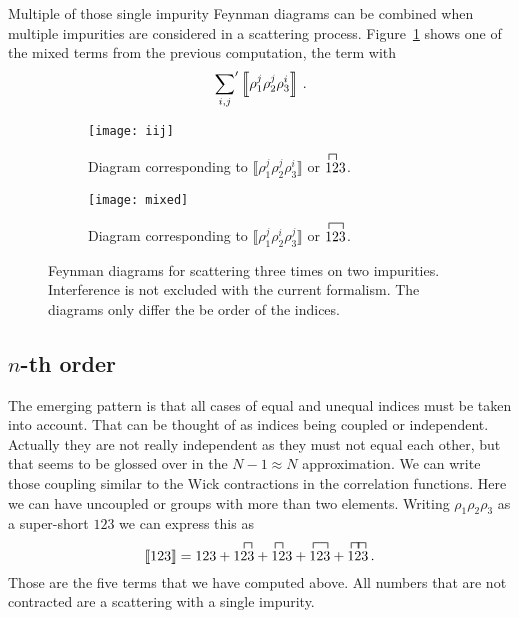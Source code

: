\documentclass[11pt, english, fleqn, DIV=15, headinclude, BCOR=1cm]{scrartcl}
\newcommand\ensemble[1]{\llbracket #1 \rrbracket}
\newcommand\Ensemble[1]{\left\llbracket #1 \right\rrbracket}
\newcommand\sump{\sideset{}{'}\sum}
\begin{document}
Multiple of those single impurity Feynman diagrams can be combined when
multiple impurities are considered in a scattering process.
Figure~\ref{fig:iij} shows one of the mixed terms from the previous
computation, the term with
\[
    \sump_{i, j} \Ensemble{\rho_1^j \rho_2^j \rho_3^i} \,.
\]

\begin{figure}
    \centering
    \begin{subfigure}[c]{0.48\linewidth}
        \centering
        \texttt{[image: iij]}
        \caption{%
             Diagram corresponding to $\ensemble{\rho_1^j \rho_2^j \rho_3^i}$
             or $\contraction{}1{}2 123$.
        }
        \label{fig:iij}
    \end{subfigure}
    \hfill
    \begin{subfigure}[c]{0.48\linewidth}
        \centering
        \texttt{[image: mixed]}
        \caption{%
             Diagram corresponding to $\ensemble{\rho_1^j \rho_2^i \rho_3^j}$
             or $\contraction{}1{2}3 123$.
        }
        \label{fig:iji}
    \end{subfigure}
    \caption{%
        Feynman diagrams for scattering three times on two impurities.
        Interference is not excluded with the current formalism. The diagrams
        only differ the be order of the indices.
    }
    \label{fig:iji/mixed}
\end{figure}

\subsection{$n$-th order}

The emerging pattern is that all cases of equal and unequal indices must be
taken into account. That can be thought of as indices being coupled or
independent. Actually they are not really independent as they must not equal
each other, but that seems to be glossed over in the $N - 1 \approx N$
approximation. We can write those coupling similar to the Wick contractions in
the correlation functions. Here we can have uncoupled or groups with more than
two elements. Writing $\rho_1 \rho_2 \rho_3$ as a super-short $123$
we can express this as
\[
    \ensemble{123}
    = 123
    +
    \contraction{1}2{}3
    123
    +
    \contraction{}1{}2
    123
    +
    \contraction{}1{2}3
    123
    +
    \contraction{1}2{}3
    \contraction{}1{}2
    123 \,.
\]
Those are the five terms that we have computed above. All numbers that are not
contracted are a scattering with a single impurity.
\end{document}

